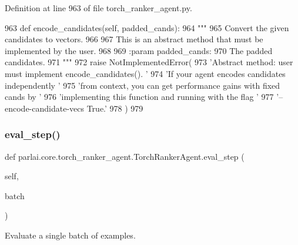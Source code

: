 Definition at line 963 of file torch\+\_\+ranker\+\_\+agent.\+py.


\begin{DoxyCode}
963     \textcolor{keyword}{def }encode\_candidates(self, padded\_cands):
964         \textcolor{stringliteral}{"""}
965 \textcolor{stringliteral}{        Convert the given candidates to vectors.}
966 \textcolor{stringliteral}{}
967 \textcolor{stringliteral}{        This is an abstract method that must be implemented by the user.}
968 \textcolor{stringliteral}{}
969 \textcolor{stringliteral}{        :param padded\_cands:}
970 \textcolor{stringliteral}{            The padded candidates.}
971 \textcolor{stringliteral}{        """}
972         \textcolor{keywordflow}{raise} NotImplementedError(
973             \textcolor{stringliteral}{'Abstract method: user must implement encode\_candidates(). '}
974             \textcolor{stringliteral}{'If your agent encodes candidates independently '}
975             \textcolor{stringliteral}{'from context, you can get performance gains with fixed cands by '}
976             \textcolor{stringliteral}{'implementing this function and running with the flag '}
977             \textcolor{stringliteral}{'--encode-candidate-vecs True.'}
978         )
979 
\end{DoxyCode}
\mbox{\label{classparlai_1_1core_1_1torch__ranker__agent_1_1TorchRankerAgent_a65bca7841123e4c3df1e09f8c4eb397f}} 
\subsubsection{\texorpdfstring{eval\+\_\+step()}{eval\_step()}}
{\footnotesize\ttfamily def parlai.\+core.\+torch\+\_\+ranker\+\_\+agent.\+Torch\+Ranker\+Agent.\+eval\+\_\+step (\begin{DoxyParamCaption}\item[{}]{self,  }\item[{}]{batch }\end{DoxyParamCaption})}

\begin{DoxyVerb}Evaluate a single batch of examples.
\end{DoxyVerb}
 

